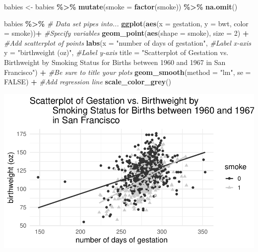 \documentclass[
]{report}
\newenvironment{Shaded}{\begin{snugshade}}{\end{snugshade}}
\newcommand{\AttributeTok}[1]{\textcolor[rgb]{0.13,0.29,0.53}{#1}}
\newcommand{\CommentTok}[1]{\textcolor[rgb]{0.56,0.35,0.01}{\textit{#1}}}
\newcommand{\ConstantTok}[1]{\textcolor[rgb]{0.56,0.35,0.01}{#1}}
\newcommand{\DecValTok}[1]{\textcolor[rgb]{0.00,0.00,0.81}{#1}}
\newcommand{\FunctionTok}[1]{\textcolor[rgb]{0.13,0.29,0.53}{\textbf{#1}}}
\newcommand{\NormalTok}[1]{#1}
\newcommand{\OtherTok}[1]{\textcolor[rgb]{0.56,0.35,0.01}{#1}}
\newcommand{\SpecialCharTok}[1]{\textcolor[rgb]{0.81,0.36,0.00}{\textbf{#1}}}
\newcommand{\StringTok}[1]{\textcolor[rgb]{0.31,0.60,0.02}{#1}}
\begin{document}
\begin{Shaded}
\begin{Highlighting}[]
\NormalTok{babies }\OtherTok{\textless{}{-}}\NormalTok{ babies }\SpecialCharTok{\%\textgreater{}\%} 
    \FunctionTok{mutate}\NormalTok{(}\AttributeTok{smoke =} \FunctionTok{factor}\NormalTok{(smoke)) }\SpecialCharTok{\%\textgreater{}\%}
    \FunctionTok{na.omit}\NormalTok{()}
           
\NormalTok{babies }\SpecialCharTok{\%\textgreater{}\%} \CommentTok{\# Data set pipes into...}
    \FunctionTok{ggplot}\NormalTok{(}\FunctionTok{aes}\NormalTok{(}\AttributeTok{x =}\NormalTok{ gestation, }\AttributeTok{y =}\NormalTok{ bwt, }\AttributeTok{color =}\NormalTok{ smoke))}\SpecialCharTok{+}  \CommentTok{\#Specify variables}
    \FunctionTok{geom\_point}\NormalTok{(}\FunctionTok{aes}\NormalTok{(}\AttributeTok{shape =}\NormalTok{ smoke), }\AttributeTok{size =} \DecValTok{2}\NormalTok{) }\SpecialCharTok{+}  \CommentTok{\#Add scatterplot of points}
    \FunctionTok{labs}\NormalTok{(}\AttributeTok{x =} \StringTok{"number of days of gestation"}\NormalTok{,  }\CommentTok{\#Label x{-}axis}
         \AttributeTok{y =} \StringTok{"birthweight (oz)"}\NormalTok{,  }\CommentTok{\#Label y{-}axis}
         \AttributeTok{title =} \StringTok{"Scatterplot of Gestation vs. Birthweight by }
\StringTok{         Smoking Status for Births between 1960 and 1967 }
\StringTok{         in San Francisco"}\NormalTok{) }\SpecialCharTok{+} 
    \CommentTok{\#Be sure to title your plots}
    \FunctionTok{geom\_smooth}\NormalTok{(}\AttributeTok{method =} \StringTok{"lm"}\NormalTok{, }\AttributeTok{se =} \ConstantTok{FALSE}\NormalTok{) }\SpecialCharTok{+} \CommentTok{\#Add regression line}
    \FunctionTok{scale\_color\_grey}\NormalTok{()}
\end{Highlighting}
\end{Shaded}

\begin{center}\includegraphics[width=0.8\linewidth]{13-VN13-regression_files/figure-latex/unnamed-chunk-8-1} \end{center}
\end{document}
